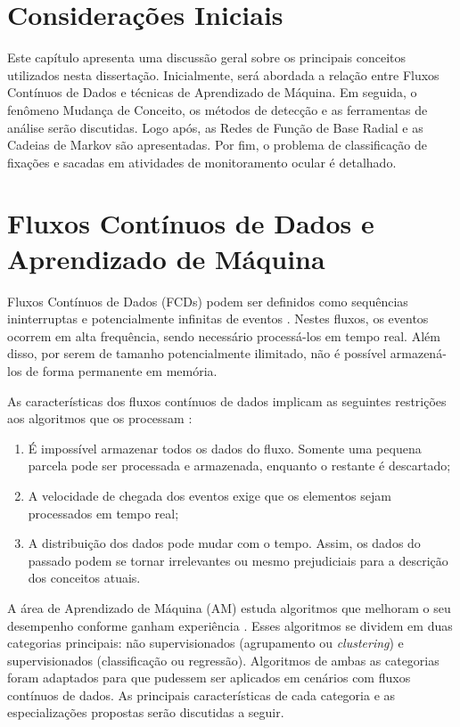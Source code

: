 \documentclass[msc, classic, a4paper]{ufbathesis}
\begin{document}
\section{Considerações Iniciais}

Este capítulo apresenta uma discussão geral sobre os principais conceitos utilizados nesta dissertação.
%
Inicialmente, será abordada a relação entre Fluxos Contínuos de Dados e técnicas de Aprendizado de Máquina.
%
Em seguida, o fenômeno Mudança de Conceito, os métodos de detecção e as ferramentas de análise serão discutidas.
%
Logo após, as Redes de Função de Base Radial e as Cadeias de Markov são apresentadas.
%
Por fim, o problema de classificação de fixações e sacadas em atividades de monitoramento ocular é detalhado.

\section{Fluxos Contínuos de Dados e Aprendizado de Máquina}

Fluxos Contínuos de Dados (FCDs) podem ser definidos como sequências ininterruptas e potencialmente infinitas de eventos \cite{Aggarwal:2006:DSM:1196418}.
%
Nestes fluxos, os eventos ocorrem em alta frequência, sendo necessário processá-los em tempo real.
%
Além disso, por serem de tamanho potencialmente ilimitado, não é possível armazená-los de forma permanente em memória.
%

As características dos fluxos contínuos de dados implicam as seguintes restrições aos algoritmos que os processam \cite{bifet2009data}:
%
\begin{enumerate}
    \item É impossível armazenar todos os dados do fluxo. Somente uma pequena parcela pode ser processada e armazenada, enquanto o restante é descartado;
    \item A velocidade de chegada dos eventos exige que os elementos sejam processados em tempo real;
    \item A distribuição dos dados pode mudar com o tempo. Assim, os dados do passado podem se tornar irrelevantes ou mesmo prejudiciais para a descrição dos conceitos atuais.
\end{enumerate}

A área de Aprendizado de Máquina (AM) estuda algoritmos que melhoram o seu desempenho conforme ganham experiência \cite{Mitchell:1997:ML:541177}.
%
Esses algoritmos se dividem em duas categorias principais:
%
não supervisionados (agrupamento ou \textit{clustering}) e supervisionados (classificação ou regressão).
%
Algoritmos de ambas as categorias foram adaptados para que pudessem ser aplicados em cenários com fluxos contínuos de dados.
%
As principais características de cada categoria e as especializações propostas serão discutidas a seguir.
\end{document}
